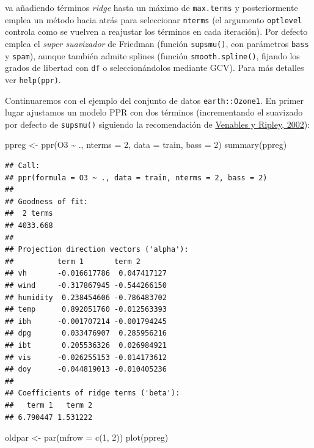 \documentclass[
  spanish,
]{book}
\newenvironment{Shaded}{\begin{snugshade}}{\end{snugshade}}
\newcommand{\AttributeTok}[1]{\textcolor[rgb]{0.77,0.63,0.00}{#1}}
\newcommand{\DecValTok}[1]{\textcolor[rgb]{0.00,0.00,0.81}{#1}}
\newcommand{\FunctionTok}[1]{\textcolor[rgb]{0.00,0.00,0.00}{#1}}
\newcommand{\NormalTok}[1]{#1}
\newcommand{\OtherTok}[1]{\textcolor[rgb]{0.56,0.35,0.01}{#1}}
\newcommand{\SpecialCharTok}[1]{\textcolor[rgb]{0.00,0.00,0.00}{#1}}
\theoremstyle{break}
\theoremstyle{definition}
\theoremstyle{definition}
\theoremstyle{definition}
\theoremstyle{definition}
\theoremstyle{remark}
\begin{document}
va añadiendo términos \emph{ridge} hasta un máximo de \texttt{max.terms} y posteriormente emplea un método hacia atrás para seleccionar \texttt{nterms} (el argumento \texttt{optlevel} controla como se vuelven a reajustar los términos en cada iteración).
Por defecto emplea el \emph{super suavizador} de Friedman (función \texttt{supsmu()}, con parámetros \texttt{bass} y \texttt{spam}), aunque también admite splines (función \texttt{smooth.spline()}, fijando los grados de libertad con \texttt{df} o seleccionándolos mediante GCV).
Para más detalles ver \texttt{help(ppr)}.

Continuaremos con el ejemplo del conjunto de datos \texttt{earth::Ozone1}. En primer lugar ajustamos un modelo PPR con dos términos (incrementando el suavizado por defecto de \texttt{supsmu()} siguiendo la recomendación de \protect\hyperlink{ref-Venables2002Modern}{Venables y Ripley, 2002}):

\begin{Shaded}
\begin{Highlighting}[]
\NormalTok{ppreg }\OtherTok{\textless{}{-}} \FunctionTok{ppr}\NormalTok{(O3 }\SpecialCharTok{\textasciitilde{}}\NormalTok{ ., }\AttributeTok{nterms =} \DecValTok{2}\NormalTok{, }\AttributeTok{data =}\NormalTok{ train, }\AttributeTok{bass =} \DecValTok{2}\NormalTok{)}
\FunctionTok{summary}\NormalTok{(ppreg)}
\end{Highlighting}
\end{Shaded}

\begin{verbatim}
## Call:
## ppr(formula = O3 ~ ., data = train, nterms = 2, bass = 2)
## 
## Goodness of fit:
##  2 terms 
## 4033.668 
## 
## Projection direction vectors ('alpha'):
##          term 1       term 2      
## vh       -0.016617786  0.047417127
## wind     -0.317867945 -0.544266150
## humidity  0.238454606 -0.786483702
## temp      0.892051760 -0.012563393
## ibh      -0.001707214 -0.001794245
## dpg       0.033476907  0.285956216
## ibt       0.205536326  0.026984921
## vis      -0.026255153 -0.014173612
## doy      -0.044819013 -0.010405236
## 
## Coefficients of ridge terms ('beta'):
##   term 1   term 2 
## 6.790447 1.531222
\end{verbatim}

\begin{Shaded}
\begin{Highlighting}[]
\NormalTok{oldpar }\OtherTok{\textless{}{-}} \FunctionTok{par}\NormalTok{(}\AttributeTok{mfrow =} \FunctionTok{c}\NormalTok{(}\DecValTok{1}\NormalTok{, }\DecValTok{2}\NormalTok{))}
\FunctionTok{plot}\NormalTok{(ppreg)}
\end{Highlighting}
\end{Shaded}
\end{document}
